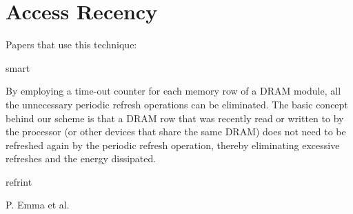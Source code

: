 \section{Access Recency}
\label{sec:acc}

Papers that use this technique:

smart\cite{smartrefresh}

By employing a time-out counter for each memory row of a DRAM module, all the unnecessary periodic refresh operations can be eliminated. The basic concept behind our scheme is that a DRAM row that was recently read or written to by the processor (or other devices that share the same DRAM) does not need to be refreshed again by the periodic refresh operation, thereby eliminating excessive refreshes and the energy dissipated.

refrint\cite{refrint}

P. Emma et al.